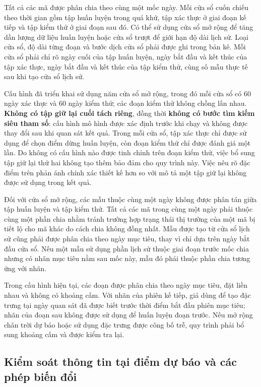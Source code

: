 \documentclass[12pt, a4paper, oneside]{report}
\begin{document}
Tất cả các mã được phân chia theo cùng một mốc ngày. Mỗi cửa sổ cuốn chiếu theo thời
gian gồm tập huấn luyện trong quá khứ, tập xác thực ở giai đoạn kế tiếp và tập kiểm
thử ở giai đoạn sau đó. Có thể sử dụng cửa sổ mở rộng để tăng dần lượng dữ liệu huấn
luyện hoặc cửa sổ trượt để giới hạn độ dài lịch sử. Loại cửa sổ, độ dài từng đoạn và
bước dịch cửa sổ phải được ghi trong bản kê. Mỗi cửa sổ phải chỉ rõ ngày cuối của tập huấn luyện, ngày bắt đầu và kết thúc của tập xác thực, ngày bắt đầu và
kết thúc của tập kiểm thử, cùng số mẫu thực tế sau khi tạo cửa sổ lịch sử.

Cấu hình đã triển khai sử dụng năm cửa sổ mở rộng, trong đó mỗi cửa sổ có 60 ngày
xác thực và 60 ngày kiểm thử; các đoạn kiểm thử không chồng lấn nhau. \textbf{Không
có tập giữ lại cuối tách riêng}, đồng thời \textbf{không có bước tìm kiếm siêu tham
số}: cấu hình mô hình được xác định trước khi chạy và không được thay đổi sau khi
quan sát kết quả. Trong mỗi cửa sổ, tập xác thực chỉ được sử dụng để chọn điểm dừng
huấn luyện, còn đoạn kiểm thử chỉ được đánh giá một lần. Do không có cấu hình nào
được tinh chỉnh trên đoạn kiểm thử, việc bổ sung tập giữ lại thứ hai không tạo thêm
bảo đảm cho quy trình này. Việc nêu rõ đặc điểm trên phản ánh chính xác thiết kế hơn
so với mô tả một tập giữ lại không được sử dụng trong kết quả.

Đối với cửa sổ mở rộng, các mẫu thuộc cùng một ngày không được phân tán giữa tập huấn
luyện và tập kiểm thử. Tất cả các mã trong cùng một ngày phải thuộc cùng một phần
chia nhằm tránh trường hợp trạng thái thị trường của một mã bị tiết lộ cho mã khác
do cách chia không đồng nhất. Mẫu được tạo từ cửa sổ lịch sử cũng phải được phân chia
theo ngày mục tiêu, thay vì chỉ dựa trên ngày bắt đầu cửa sổ. Nếu một mẫu sử dụng
phần lịch sử thuộc giai đoạn trước mốc chia nhưng có nhãn mục tiêu nằm sau mốc này,
mẫu đó phải thuộc phần chia tương ứng với nhãn.

Trong cấu hình hiện tại, các đoạn được phân chia theo ngày mục tiêu, đặt liền nhau
và không có khoảng cấm. Với nhãn của phiên kế tiếp, giá dùng để tạo đặc trưng tại
ngày quan sát đã được biết trước thời điểm bắt đầu phiên mục tiêu; nhãn của đoạn sau
không được sử dụng để huấn luyện đoạn trước. Nếu mở rộng chân trời dự báo hoặc sử
dụng đặc trưng được công bố trễ, quy trình phải bổ sung khoảng cấm và được kiểm tra
lại.

\subsection{Kiểm soát thông tin tại điểm dự báo và các phép biến đổi}
\end{document}

